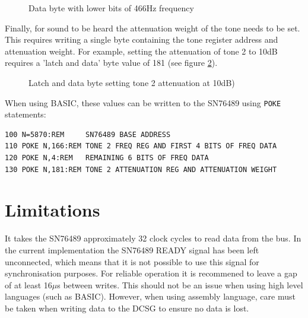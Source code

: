 \documentclass[a4paper,11pt,twoside,openright]{report}
\newcommand{\code}{\texttt}
\begin{document}
\begin{figure}[h!]
\centering
{}
\caption{Latch and data byte to set tone 2 at 446Hz}
\label{fig:samplelatch}
\vspace*{\floatsep}
\caption{Data byte with lower bits of 466Hz frequency}
\label{fig:sampledata}
\end{figure}

Finally, for sound to be heard the attenuation weight of the tone needs to be set. This requires 
writing a single byte containing the tone register address and attenuation weight. For example, setting 
the attenuation  of tone 2 to 10dB requires a 'latch and data' byte value of 181 (see figure
\ref{fig:sampleattenuation}).

\begin{figure}[h!]
\centering	
{}
\caption{Latch and data byte setting tone 2 attenuation at 10dB)}
\label{fig:sampleattenuation}
\end{figure}

When using BASIC, these values can be written to the SN76489 using \code{POKE} statements:

\begin{lstlisting}[language={[Visual]Basic},basicstyle=\footnotesize\ttfamily]
100 N=5870:REM     SN76489 BASE ADDRESS
110 POKE N,166:REM TONE 2 FREQ REG AND FIRST 4 BITS OF FREQ DATA
120 POKE N,4:REM   REMAINING 6 BITS OF FREQ DATA
130 POKE N,181:REM TONE 2 ATTENUATION REG AND ATTENUATION WEIGHT
\end{lstlisting}

\section*{Limitations}
It takes the SN76489 approximately 32 clock cycles to read data from the bus. In the current
implementation the SN76489 READY signal has been left unconnected, which means that it is not 
possible to use this signal for synchronisation purposes. For reliable operation it is recommened 
to leave a gap of at least 16$\mu$s between writes. This should not be an issue when using high level 
languages (such as BASIC). However, when using assembly language, care must be taken when writing 
data to the DCSG to ensure no data is lost.
\end{document}
